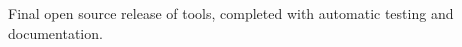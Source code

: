 \begin{workpackage}
\begin{wpdescription}
%
%

\end{wpdescription}

\begin{tasklist}




\end{tasklist}


\begin{wpdelivs}
\begin{wpdeliv}[due=36,miles=final,id=binder-tools-software,dissem=PU,nature=OTHER,lead=SRL]
  {Final open source release of \TheProject tools, completed with automatic
    testing and documentation.}
\end{wpdeliv}

\end{wpdelivs}
\end{workpackage}

